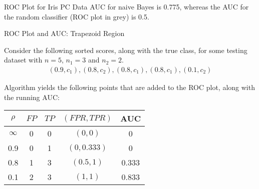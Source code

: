 \begin{frame}{ROC Plot for Iris PC Data}
AUC for naive Bayes is 0.775, whereas the AUC for the random classifier
(ROC plot in grey) is 0.5.\\
\begin{figure}[!t]\vspace*{-0.4pc}
\centering
{}
\end{figure}
\end{frame}


\begin{frame}{ROC Plot and AUC: Trapezoid Region}

  Consider the following sorted scores, along with the true class, for
  some testing
  dataset with $n = 5$, $n_1 = 3$ and $n_2 = 2$.
  \begin{align*}
    (0.9, c_1), (0.8, c_2), (0.8, c_1), (0.8, c_1), (0.1, c_2)
  \end{align*}

Algorithm yields the following points that
  are added to the ROC plot, along with the running AUC:

\medskip

\begin{center}
\begin{tabular}{|c|c|c|c|c|}
    \hline
  $\rho$ & $\mathit{FP}$ & $\mathit{TP}$ & $(\mathit{FPR}, \mathit{TPR})$ & AUC\\
  \hline
  $\infty$ & 0 & 0 & $(0,0)$ & 0\\[-2pt]
  0.9 & 0 & 1 & $(0, 0.333)$ & 0\\[-2pt]
  0.8 & 1 & 3 & $(0.5, 1)$ & 0.333\\[-2pt]
  0.1 & 2 & 3 & $(1, 1)$ & 0.833\\
  \hline
  \end{tabular}
\end{center}

\end{frame}


